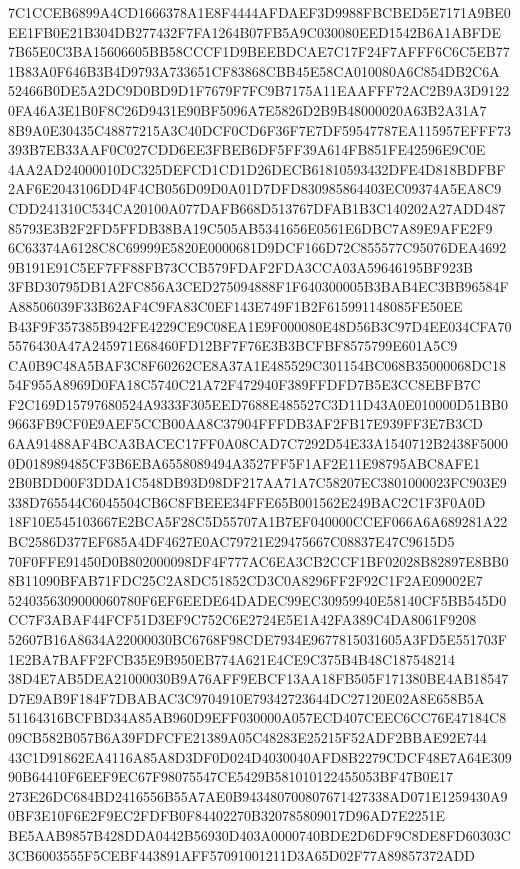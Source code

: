 \documentclass[UTF8,fontset=fandol,zihao=-4,a4paper]{ctexart}
\begin{document}
{{7C1CCEB6899A4CD1666378A1E8F4444AFDAEF3D9988FBCBED5E7171A9BE0EE1FB0E21B304DB277432F7FA1264B07FB5A9C030080EED1542B6A1ABFDE
7B65E0C3BA15606605BB58CCCF1D9BEEBDCAE7C17F24F7AFFF6C6C5EB771B83A0F646B3B4D9793A733651CF83868CBB45E58CA010080A6C854DB2C6A
52466B0DE5A2DC9D0BD9D1F7679F7FC9B7175A11EAAFFF72AC2B9A3D91220FA46A3E1B0F8C26D9431E90BF5096A7E5826D2B9B48000020A63B2A31A7
8B9A0E30435C48877215A3C40DCF0CD6F36F7E7DF59547787EA115957EFFF73393B7EB33AAF0C027CDD6EE3FBEB6DF5FF39A614FB851FE42596E9C0E
4AA2AD24000010DC325DEFCD1CD1D26DECB61810593432DFE4D818BDFBF2AF6E2043106DD4F4CB056D09D0A01D7DFD830985864403EC09374A5EA8C9
CDD241310C534CA20100A077DAFB668D513767DFAB1B3C140202A27ADD48785793E3B2F2FD5FFDB38BA19C505AB5341656E0561E6DBC7A89E9AFE2F9
6C63374A6128C8C69999E5820E0000681D9DCF166D72C855577C95076DEA46929B191E91C5EF7FF88FB73CCB579FDAF2FDA3CCA03A59646195BF923B
3FBD30795DB1A2FC856A3CED275094888F1F640300005B3BAB4EC3BB96584FA88506039F33B62AF4C9FA83C0EF143E749F1B2F615991148085FE50EE
B43F9F357385B942FE4229CE9C08EA1E9F000080E48D56B3C97D4EE034CFA705576430A47A245971E68460FD12BF7F76E3B3BCFBF8575799E601A5C9
CA0B9C48A5BAF3C8F60262CE8A37A1E485529C301154BC068B35000068DC1854F955A8969D0FA18C5740C21A72F472940F389FFDFD7B5E3CC8EBFB7C
F2C169D15797680524A9333F305EED7688E485527C3D11D43A0E010000D51BB09663FB9CF0E9AEF5CCB00AA8C37904FFFDB3AF2FB17E939FF3E7B3CD
6AA91488AF4BCA3BACEC17FF0A08CAD7C7292D54E33A1540712B2438F50000D018989485CF3B6EBA6558089494A3527FF5F1AF2E11E98795ABC8AFE1
2B0BDD00F3DDA1C548DB93D98DF217AA71A7C58207EC3801000023FC903E9338D765544C6045504CB6C8FBEEE34FFE65B001562E249BAC2C1F3F0A0D
18F10E545103667E2BCA5F28C5D55707A1B7EF040000CCEF066A6A689281A22BC2586D377EF685A4DF4627E0AC79721E29475667C08837E47C9615D5
70F0FFE91450D0B802000098DF4F777AC6EA3CB2CCF1BF02028B82897E8BB08B11090BFAB71FDC25C2A8DC51852CD3C0A8296FF2F92C1F2AE09002E7
5240356309000060780F6EF6EEDE64DADEC99EC30959940E58140CF5BB545D0CC7F3ABAF44FCF51D3EF9C752C6E2724E5E1A42FA389C4DA8061F9208
52607B16A8634A22000030BC6768F98CDE7934E9677815031605A3FD5E551703F1E2BA7BAFF2FCB35E9B950EB774A621E4CE9C375B4B48C187548214
38D4E7AB5DEA21000030B9A76AFF9EBCF13AA18FB505F171380BE4AB18547D7E9AB9F184F7DBABAC3C9704910E79342723644DC27120E02A8E658B5A
51164316BCFBD34A85AB960D9EFF030000A057ECD407CEEC6CC76E47184C809CB582B057B6A39FDFCFE21389A05C48283E25215F52ADF2BBAE92E744
43C1D91862EA4116A85A8D3DF0D024D4030040AFD8B2279CDCF48E7A64E30990B64410F6EEF9EC67F98075547CE5429B581010122455053BF47B0E17
273E26DC684BD2416556B55A7AE0B943480700807671427338AD071E1259430A90BF3E10F6E2F9EC2FDFB0F84402270B320785809017D96AD7E2251E
BE5AAB9857B428DDA0442B56930D403A0000740BDE2D6DF9C8DE8FD60303C3CB6003555F5CEBF443891AFF57091001211D3A65D02F77A89857372ADD
}}
\end{document}
